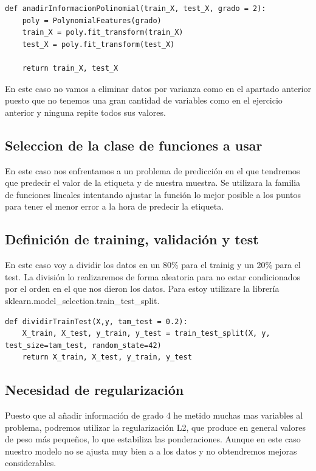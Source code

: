 \documentclass[titlepage]{article}
\begin{document}
\begin{lstlisting}
def anadirInformacionPolinomial(train_X, test_X, grado = 2):
	poly = PolynomialFeatures(grado)
	train_X = poly.fit_transform(train_X)
	test_X = poly.fit_transform(test_X)
	
	return train_X, test_X
\end{lstlisting}

En este caso no vamos a eliminar datos por varianza como en el apartado anterior puesto que no tenemos una gran cantidad de variables como en el ejercicio anterior y ninguna repite todos sus valores.

\subsection{Seleccion de la clase de funciones a usar}
En este caso nos enfrentamos a un problema de predicción en el que tendremos que predecir el valor de la etiqueta y de nuestra muestra. Se utilizara la familia de funciones lineales intentando ajustar la función lo mejor posible a los puntos para tener el menor error a la hora de predecir la etiqueta.

\subsection{Definición de training, validación y test}
En este caso voy a dividir los datos en un 80\% para el trainig y un 20\% para el test. La división lo realizaremos de forma aleatoria para no estar condicionados por el orden en el que nos dieron los datos. Para estoy utilizare la librería sklearn.model\_selection.train\_test\_split.

\begin{lstlisting}
def dividirTrainTest(X,y, tam_test = 0.2):
	X_train, X_test, y_train, y_test = train_test_split(X, y, test_size=tam_test, random_state=42)
	return X_train, X_test, y_train, y_test
\end{lstlisting}

\subsection{Necesidad de regularización}
Puesto que al añadir información de grado 4 he metido muchas mas variables al problema, podremos utilizar la regularización L2, que produce en general valores de peso más pequeños, lo que estabiliza las ponderaciones. Aunque en este caso nuestro modelo no se ajusta muy bien a a los datos y no obtendremos mejoras considerables.
\end{document}
